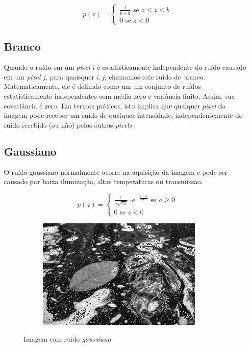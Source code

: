 \documentclass[10pt,a4paper]{article}
\newcommand{\pixel}{\textit{pixel} }
\newcommand{\pixels}{\textit{pixels} }
\begin{document}
\begin{equation}
p(z) = \left\{
    \begin{array}{l}
        \frac{1}{b - a} \text{ se } a \le z \le b \\
        0 \text{ se } z < 0
    \end{array}\right.
\end{equation}

\subsection{Branco}
Quando o ruído em um \pixel $i$ é estatisticamente independente do ruído causado em um \pixel $j$, para quaisquer $i,j$, chamamos este ruído de branco. Matematicamente, ele é definido como um um conjunto de ruídos estatisticamente independentes com média zero e variância finita. Assim, sua covariância é zero. Em termos práticos, isto implica que qualquer \pixel da imagem pode receber um ruído de qualquer intensidade, independentemente do ruído recebido (ou não) pelos outros \pixels.

\subsection{Gaussiano}
O ruído gaussiano normalmente ocorre na aquisição da imagem e pode ser causado por baixa iluminação, altas temperaturas ou transmissão.

\begin{equation}
p(z) = \left\{
    \begin{array}{l}
        \frac{1}{\sigma \sqrt{2 \pi}} \cdot e^{-\frac{z - \mu}{2 \sigma^{2}}} \text{ se } a \ge 0 \\
        0 \text{ se } z < 0
    \end{array}\right.
\end{equation}

\begin{figure}[!ht]
    \centering
    \begin{subfigure}[ht]{0.45\textwidth}
        \includegraphics[width=\textwidth]{dst_ga.jpg}
        \label{fig:gauss}
    \end{subfigure}
    \caption{Imagem com ruído \textit{gaussiano}}
\end{figure}
\end{document}
